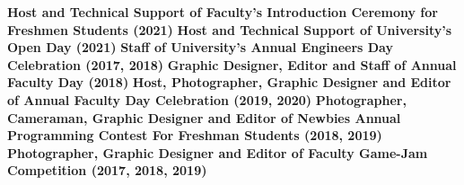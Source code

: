 \begin{cventries}
\skillentry
    {\bullet \space \textbf{Host and Technical Support of Faculty's Introduction Ceremony for Freshmen Students (2021)}\newline 
    \bullet \space \textbf{Host and Technical Support of University's Open Day (2021)}\newline 
    \bullet \space \textbf{Staff of University's Annual Engineers Day Celebration (2017, 2018)}\newline 
    \bullet \space \textbf{Graphic Designer, Editor and Staff of Annual Faculty Day (2018)}\newline 
    \bullet \space \textbf{Host, Photographer, Graphic Designer and Editor  of Annual Faculty Day Celebration (2019, 2020)}\newline 
    \bullet \space \textbf{Photographer, Cameraman, Graphic Designer and Editor of Newbies Annual Programming Contest For Freshman Students (2018, 2019)}\newline
    \bullet \space \textbf{Photographer, Graphic Designer and Editor of Faculty Game-Jam Competition (2017, 2018, 2019)}
    }
\end{cventries}

